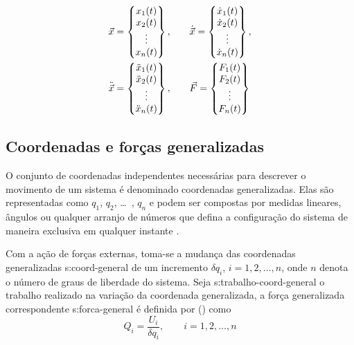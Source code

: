 \documentclass[12pt,openright,oneside,a4paper,
	chapter=TITLE,section=TITLE,
	english,brazil]{abntex2}
\begin{document}
	\begin{align} \label{eqn:vetores}
		\vec{x} =
		\begin{Bmatrix}
			x_1(t)\\ x_2(t)\\ \vdots\\ x_n(t)\\
		\end{Bmatrix},\qquad &
		\dot{\vec{x}} = 
		\begin{Bmatrix}
			\dot{x}_1(t)\\ \dot{x}_2(t)\\ \vdots\\ \dot{x}_n(t)\\
		\end{Bmatrix}, \notag\\
		\ddot{\vec{x}} = 
		\begin{Bmatrix}
			\ddot{x}_1(t)\\ \ddot{x}_2(t)\\ \vdots \\ \ddot{x}_n(t)\\  
		\end{Bmatrix},\qquad &
		\vec{F} = 
		\begin{Bmatrix}
			F_1(t)\\ F_2(t)\\ \vdots\\ F_n(t)\\
		\end{Bmatrix}
	\end{align}
	
	\subsection{Coordenadas e forças generalizadas} \label{sec:coord-generalizadas}
	O conjunto de coordenadas independentes necessárias para descrever o movimento de um sistema é denominado coordenadas generalizadas. Elas são representadas como $q_1$, $q_2$, \dots\ , $q_n$ e podem ser compostas por medidas lineares, ângulos ou qualquer arranjo de números que defina a configuração do sistema de maneira exclusiva em qualquer instante \cite{rao:2008}.
	
	Com a ação de forças externas, toma-se a mudança das coordenadas generalizadas \gls{s:coord-general} de um incremento $\delta q_i $, $ i = 1, 2, \dots, n $, onde $ n $ denota o número de graus de liberdade do sistema. Seja \gls{s:trabalho-coord-general} o trabalho realizado na variação da coordenada generalizada, a força generalizada correspondente \gls{s:forca-general} é definida por  (\citeyear{rao:2008}) como
	\begin{equation}
		Q_i = \frac{U_i}{\delta q_i},\qquad i = 1, 2, \dots, n
	\end{equation}
	
\end{document}

